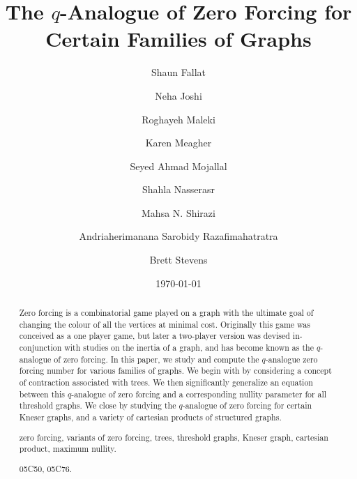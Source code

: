 \documentclass[3p,times,12pt]{article}
\title{The $q$-Analogue of Zero Forcing for Certain Families of Graphs}
\author{Shaun Fallat \footnotemark[1] \footnotemark[2]  \footnotemark[8]
\and
Neha Joshi \footnotemark[1]  \footnotemark[2]
\and
Roghayeh Maleki \footnotemark[7]
\and
Karen Meagher \footnotemark[1] \footnotemark[2]
\and
Seyed Ahmad Mojallal \footnotemark[1] \footnotemark[2]
\and
Shahla Nasserasr \footnotemark[3]
\and
Mahsa N. Shirazi \footnotemark[1] \footnotemark[5]
\and
Andriaherimanana Sarobidy Razafimahatratra \footnotemark[7]
\and
Brett Stevens \footnotemark[4]
}
\date{\today}
\begin{document}
\maketitle

\renewcommand{\thefootnote}{\fnsymbol{footnote}}

\renewcommand{\thefootnote}{\arabic{footnote}}

\begin{abstract}
Zero forcing is a combinatorial game played on a graph with the ultimate goal of changing the colour of all the vertices at minimal cost.  Originally this game was conceived as a one player game, but later a two-player version was devised in-conjunction with studies on the inertia of a graph, and has become known as the $q$-analogue of zero forcing. In this paper, we study and compute the $q$-analogue zero forcing number for various families of graphs. We begin with by considering a concept of contraction associated with trees. We then significantly generalize an equation between this $q$-analogue of zero forcing and a corresponding nullity parameter for all threshold graphs. We close by studying the $q$-analogue of zero forcing for certain Kneser graphs, and a variety of cartesian products of structured graphs.




\vspace{.4cm}
 zero forcing, variants of zero forcing, trees, threshold graphs, Kneser graph, cartesian product, maximum nullity.

\vspace{.4cm}
 05C50, 05C76.
\end{abstract}
\end{document}
